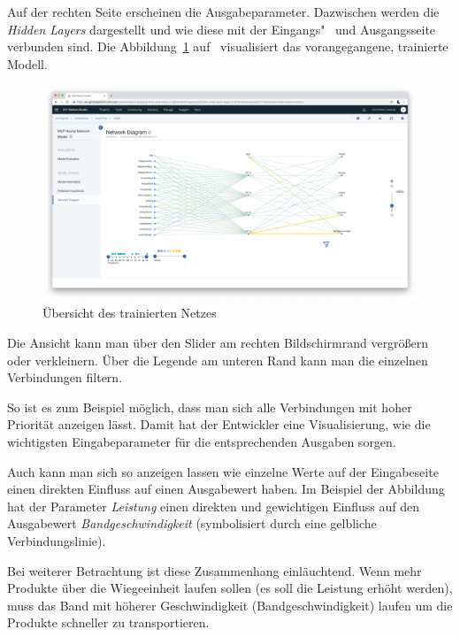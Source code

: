 Auf der rechten Seite erscheinen die Ausgabeparameter. Dazwischen werden die \textit{Hidden Layers} dargestellt und wie
diese mit der Eingangs"~ und Ausgangsseite verbunden sind. Die Abbildung~\ref{fig:umsetzung_model_network_diagram}
auf~\pageref{fig:umsetzung_model_network_diagram} visualisiert das vorangegangene, trainierte Modell.

\begin{figure}[h]
    \centering
    \includegraphics[width=\textwidth]{images/kapitel_3/model_network_diagram.png}
    \caption{Übersicht des trainierten Netzes}
    \label{fig:umsetzung_model_network_diagram}
\end{figure}

Die Ansicht kann man über den Slider am rechten Bildschirmrand vergrößern oder verkleinern. Über die Legende am unteren
Rand kann man die einzelnen Verbindungen filtern.

So ist es zum Beispiel möglich, dass man sich alle Verbindungen mit hoher Priorität anzeigen lässt. Damit hat der
Entwickler eine Visualisierung, wie die wichtigsten Eingabeparameter für die entsprechenden Ausgaben sorgen.

Auch kann man sich so anzeigen lassen wie einzelne Werte auf der Eingabeseite einen direkten Einfluss auf einen
Ausgabewert haben. Im Beispiel der Abbildung hat der Parameter \textit{Leistung} einen direkten und gewichtigen
Einfluss auf den Ausgabewert \textit{Bandgeschwindigkeit} (symbolisiert durch eine gelbliche Verbindungslinie).

Bei weiterer Betrachtung ist diese Zusammenhang einläuchtend. Wenn mehr Produkte über die Wiegeeinheit laufen sollen (es
soll die Leistung erhöht werden), muss das Band mit höherer Geschwindigkeit (Bandgeschwindigkeit) laufen um die Produkte
schneller zu transportieren.

